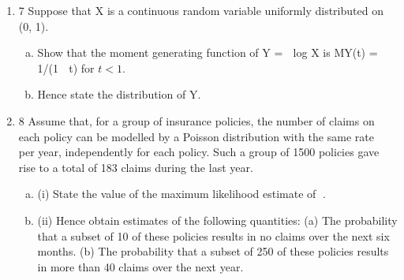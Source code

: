 \documentclass[a4paper,12pt]{article}
\begin{document}
\begin{enumerate}
\item 7 Suppose that X is a continuous random variable uniformly distributed on (0, 1).
\begin{enumerate}[(a)]
    \item  Show that the moment generating function of Y =  log X is
MY(t) = 1/(1  t) for $t < 1$. 
    \item Hence state the distribution of Y. 
\end{enumerate}
\item 8 Assume that, for a group of insurance policies, the number of claims on each policy
can be modelled by a Poisson distribution with the same rate  per year,
independently for each policy. Such a group of 1500 policies gave rise to a total of
183 claims during the last year.
\begin{enumerate}[(a)]
    \item (i) State the value of the maximum likelihood estimate of . 
\item (ii) Hence obtain estimates of the following quantities:
(a) The probability that a subset of 10 of these policies results in no claims
over the next six months.
(b) The probability that a subset of 250 of these policies results in more
than 40 claims over the next year. 
\end{enumerate}
\end{enumerate}
\newpage
\end{document}
